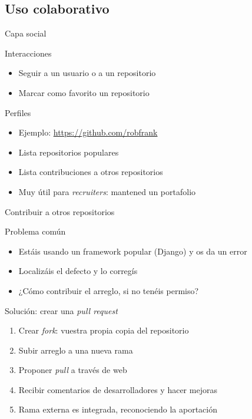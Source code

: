 \documentclass[xcolor=svgnames]{beamer}
\begin{document}
\subsection{Uso colaborativo}

\begin{frame}{Capa social}
  \begin{block}{Interacciones}
    \begin{itemize}
    \item Seguir a un usuario o a un repositorio
    \item Marcar como favorito un repositorio
    \end{itemize}
  \end{block}

  \begin{block}{Perfiles}
    \begin{itemize}
    \item Ejemplo: \url{https://github.com/robfrank}
    \item Lista repositorios populares
    \item Lista contribuciones a otros repositorios
    \item Muy útil para \emph{recruiters}: mantened un portafolio
    \end{itemize}
  \end{block}
\end{frame}

\begin{frame}{Contribuir a otros repositorios}
  \begin{block}{Problema común}
    \begin{itemize}
    \item Estáis usando un framework popular (Django) y os da un error
    \item Localizáis el defecto y lo corregís
    \item ¿Cómo contribuir el arreglo, si no tenéis permiso?
    \end{itemize}
  \end{block}

  \begin{block}{Solución: crear una \emph{pull request}}
    \begin{enumerate}
    \item Crear \emph{fork}: vuestra propia copia del repositorio
    \item Subir arreglo a una nueva rama
    \item Proponer \emph{pull} a través de web
    \item Recibir comentarios de desarrolladores y hacer mejoras
    \item Rama externa es integrada, reconociendo la aportación
    \end{enumerate}
  \end{block}
\end{frame}
\end{document}
